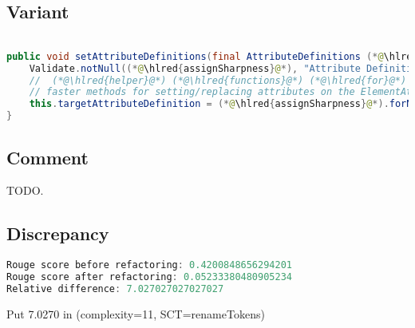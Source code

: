 \documentclass[11pt]{article}
\DeclareRobustCommand{\hlred}[1]{{\sethlcolor{YellowOrange}\hl{#1}}}
\begin{document}
  \subsection{Variant}

  \begin{lstlisting}[language=java]

public void setAttributeDefinitions(final AttributeDefinitions (*@\hlred{assignSharpness}@*)) {
    Validate.notNull((*@\hlred{assignSharpness}@*), "Attribute Definitions cannot be null");
    //  (*@\hlred{helper}@*) (*@\hlred{functions}@*) (*@\hlred{for}@*) (*@\hlred{implementing}@*) (*@\hlred{a}@*) (*@\hlred{subclass}@*) (*@\hlred{and}@*) (*@\hlred{providing}@*) (*@\hlred{a}@*) (*@\hlred{lot}@*) to (*@\hlred{provide}@*) (*@\hlred{for}@*) (*@\hlred{simplicity}@*) (*@\hlred{and}@*) (*@\hlred{for}@*)
    // faster methods for setting/replacing attributes on the ElementAttributes implementation
    this.targetAttributeDefinition = (*@\hlred{assignSharpness}@*).forName(getTemplateMode(), this.targetAttrCompleteName);
}
  \end{lstlisting}

  \subsection{Comment}

  TODO.

  \subsection{Discrepancy}

  \begin{lstlisting}[language=java]
Rouge score before refactoring: 0.4200848656294201
Rouge score after refactoring: 0.05233380480905234
Relative difference: 7.027027027027027
  \end{lstlisting}

  Put 7.0270 in (complexity=11, SCT=renameTokens)
\end{document}
